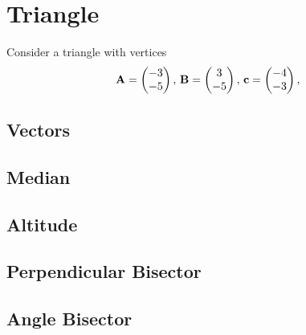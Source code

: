 \documentclass[11pt]{book}
\begin{document}
\frontmatter
\tableofcontents
\setcounter{page}{1}
\mainmatter
\chapter{Triangle}
Consider a triangle with vertices
\begin{align}
\label{eq:tri-pts}
\vec{A}=\myvec{-3 \\ -5},\,
\vec{B}=\myvec{3\\-5},\,
	\vec{c}=\myvec{-4\\-3},\,
\end{align}

\section{Vectors}

\section{Median}
%
\section{Altitude}
\section{Perpendicular Bisector}
\section{Angle Bisector}
\end{document}
